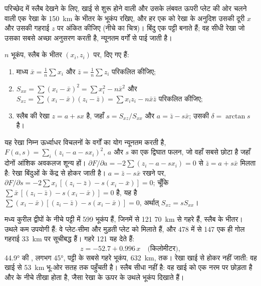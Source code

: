 परिच्छेद में स्लैब देखने के लिए, खाई से शुरू होने वाली और उसके लंबवत ऊपरी प्लेट की ओर चलने वाली एक रेखा के \qty{150}{km} के भीतर के भूकंप रखिए, और हर एक को रेखा के अनुदिश उसकी दूरी $x$ और उसकी गहराई $z$ पर अंकित कीजिए (नीचे का चित्र)। बिंदु एक पट्टी बनाते हैं; वह सीधी रेखा जो उसका सबसे अच्छा अनुसरण करती है, न्यूनतम वर्गों से पाई जाती है।

\begin{method}\label{met:b1:active-margins:lsq}
$n$ भूकंप, स्लैब के भीतर $(x_i, z_i)$ पर, दिए गए हैं:
\begin{enumerate}
  \item माध्य $\bar x = \frac1n\sum x_i$ और $\bar z = \frac1n\sum z_i$ परिकलित कीजिए;
  \item $S_{xx} = \sum (x_i - \bar x)^2 = \sum x_i^2 - n\bar x^2$ और
        $S_{xz} = \sum (x_i - \bar x)(z_i - \bar z) = \sum x_i z_i - n\bar x\bar z$ परिकलित कीजिए;
  \item स्लैब की रेखा $z = a + s x$ है, जहाँ $s = S_{xz}/S_{xx}$ और $a = \bar z - s\bar x$; उसकी  $\delta = \arctan s$ है।
\end{enumerate}
\end{method}

यह रेखा निम्न ऊर्ध्वाधर विचलनों के वर्गों का योग न्यूनतम करती है, $F(a, s) = \sum_i (z_i - a - s x_i)^2$, $a$ और $s$ का एक द्विघात फलन, जो वहाँ सबसे छोटा है जहाँ दोनों आंशिक अवकलज शून्य हों। $\partial F/\partial a =
-2\sum (z_i - a - s x_i) = 0$ से $\bar z = a + s\bar x$ मिलता है: रेखा बिंदुओं के केंद्र से होकर जाती है। $a = \bar z - s\bar x$ रखने पर, $\partial F/\partial s = -2\sum x_i\,[(z_i - \bar z) - s(x_i - \bar x)] = 0$; चूँकि $\sum \bar x\,[(z_i - \bar z) - s(x_i - \bar x)] = 0$ है, यह है $\sum (x_i - \bar x)[(z_i - \bar z) - s(x_i - \bar x)] = 0$, अर्थात् $S_{xz} = s S_{xx}$।

मध्य कुरील द्वीपों के नीचे पट्टी में 599 भूकंप हैं, जिनमें से 121 \qty{70}{km} से गहरे हैं, स्लैब के भीतर। उथले कम उपयोगी हैं: वे प्लेट-सीमा और मुड़ती प्लेट को मिलाते हैं, और 478 में से 147 एक ही गोल गहराई \qty{33}{km} पर सूचीबद्ध हैं। गहरे 121 यह देते हैं:
\[
  z = -52.7 + 0.996\,x \quad\text{(किलोमीटर)},
\]
\ang{44.9} की , लगभग \ang{45}, पट्टी के सबसे गहरे भूकंप, \qty{632}{km}, तक। रेखा खाई से होकर नहीं जाती: वह खाई से \qty{53}{km} भू-ओर सतह तक पहुँचती है। स्लैब सीधा नहीं है: वह खाई को एक नरम  पर छोड़ता है और  के नीचे तीखा होता है, जैसा रेखा के ऊपर के उथले भूकंप दिखाते हैं।

